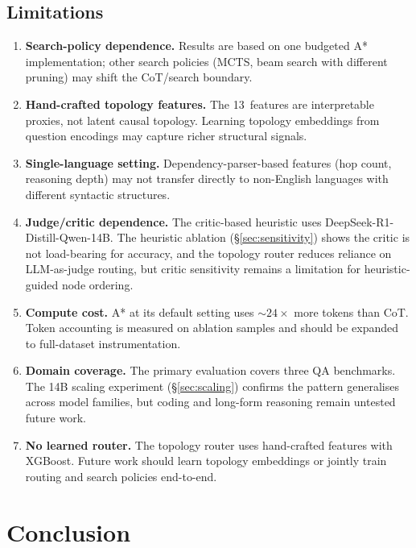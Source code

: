 \documentclass{article}
\begin{document}
\subsection{Limitations}

\begin{enumerate}[leftmargin=1.5em,itemsep=3pt]
\item \textbf{Search-policy dependence.}  Results are based on one budgeted A*
implementation; other search policies (MCTS, beam search with different
pruning) may shift the CoT/search boundary.
\item \textbf{Hand-crafted topology features.}  The 13~features are
interpretable proxies, not latent causal topology.  Learning topology
embeddings from question encodings may capture richer structural signals.
\item \textbf{Single-language setting.}  Dependency-parser-based features
(hop count, reasoning depth) may not transfer directly to non-English
languages with different syntactic structures.
\item \textbf{Judge/critic dependence.}  The critic-based heuristic uses
DeepSeek-R1-Distill-Qwen-14B.  The heuristic ablation
(\S\ref{sec:sensitivity}) shows the critic is not load-bearing for accuracy,
and the topology router reduces reliance on LLM-as-judge routing, but critic
sensitivity remains a limitation for heuristic-guided node ordering.
\item \textbf{Compute cost.}  A* at its default setting uses
${\sim}24\times$ more tokens than CoT.  Token accounting is measured on
ablation samples and should be expanded to full-dataset instrumentation.
\item \textbf{Domain coverage.}  The primary evaluation covers three QA
benchmarks.  The 14B scaling experiment (\S\ref{sec:scaling}) confirms the
pattern generalises across model families, but coding and long-form reasoning
remain untested future work.
\item \textbf{No learned router.}  The topology router uses hand-crafted
features with XGBoost.  Future work should learn topology embeddings or
jointly train routing and search policies end-to-end.
\end{enumerate}

\section{Conclusion}
\label{sec:conclusion}
\end{document}
